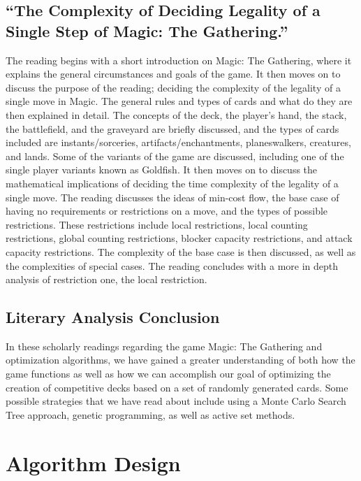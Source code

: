 \documentclass[12pt, letterpaper]{article}
\begin{document}
\subsection{\enquote{The Complexity of Deciding Legality of a Single Step of Magic: The Gathering.}}
\label{sec:3.8}

The reading begins with a short introduction on Magic: The Gathering,
where it explains the general circumstances and goals of the game.
It then moves on to discuss the purpose of the reading;
deciding the complexity of the legality of a single move in Magic.
The general rules and types of cards and what do they are then explained in detail.
The concepts of the deck, the player's hand, the stack, the battlefield,
and the graveyard are briefly discussed, and the types of cards included are instants/sorceries,
artifacts/enchantments, planeswalkers, creatures, and lands.
Some of the variants of the game are discussed,
including one of the single player variants known as Goldfish.
It then moves on to discuss the mathematical implications of
deciding the time complexity of the legality of a single move.
The reading discusses the ideas of min-cost flow,
the base case of having no requirements or restrictions on a move,
and the types of possible restrictions.
These restrictions include local restrictions, local counting restrictions,
global counting restrictions, blocker capacity restrictions, and attack capacity restrictions.
The complexity of the base case is then discussed,
as well as the complexities of special cases.
The reading concludes with a more in depth analysis of restriction one, the local restriction.

\subsection{Literary Analysis Conclusion}

In these scholarly readings regarding the game Magic: The Gathering and optimization algorithms,
we have gained a greater understanding of both how the game functions
as well as how we can accomplish our goal of optimizing the creation of competitive decks
based on a set of randomly generated cards.
Some possible strategies that we have read about include
using a Monte Carlo Search Tree approach, genetic programming, as well as active set methods.

\section{Algorithm Design}
\end{document}
